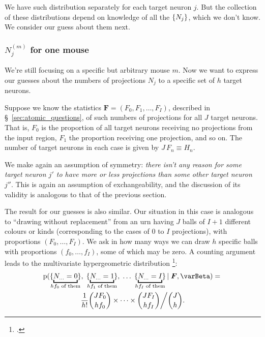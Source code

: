 \documentclass[\ifafour a4paper,12pt,\else a5paper,10pt,\fi%
onecolumn,oneside,article,%
british%
]{memoir}
\theoremstyle{remark}
\theoremstyle{innote}
\newcommand*{\citep}{\footcites}
\newcommand*{\pf}{\mathrm{p}}%
\renewcommand*{\|}[1][]{\nonscript\,#1\vert\nonscript\;\mathopen{}}
\newcommand*{\sect}{\S}%
\newcommand*{\chap}{ch.}%
\newcommand*{\yI}{\varBeta}
\newcommand*{\yF}{\bm{F}}
\newcommand*{\yNm}[1][m]{N^{(#1)}}
\DeclarePairedDelimiter\tu{\{}{\}}
\begin{document}
We have such distribution separately for each target neuron $j$. But the
collection of these distributions depend on knowledge of all the
$\tu{N_{j}}$, which we don't know. We consider our guess about them next.



\subsubsection{$\yNm_{j}$ for one mouse}
\label{sec:onemouse_exch}

We're still focusing on a specific but arbitrary mouse $m$. Now we want to
express our guesses about the numbers of projections $N_{j}$ to a specific
set of $h$ target neurons.

Suppose we know the statistics $\yF=(F_{0}, F_{1}, \dotsc, F_{I})$,
described in \sect~\ref{sec:atomic_questions}, of such numbers of
projections for all $J$ target neurons. That is, $F_{0}$ is the proportion
of all target neurons receiving no projections from the input region,
$F_{1}$ the proportion receiving one projection, and so on. The number of
target neurons in each case is given by $J\,F_{n} \equiv H_{n}$.

We make again an assumption of symmetry: \emph{there isn't any reason for
  some target neuron $j'$ to have more or less projections than some other
  target neuron $j''$}. This is again an assumption of exchangeability, and
the discussion of its validity is analogous to that of the previous
section.

The result for our guesses is also similar. Our situation in this case is
analogous to \enquote{drawing without replacement} from an urn having $J$
balls of $I+1$ different colours or kinds (corresponding to the cases of
$0$ to $I$ projections), with proportions $(F_{0}, \dotsc, F_{I})$. We ask
in how many ways we can draw $h$ specific balls with proportions
$(f_{0}, \dotsc, f_{I})$, some of which may be zero. A counting argument
leads to the multivariate hypergeometric distribution
\citep[\chap~39]{johnsonetal1969_r1996}:
\begin{multline}
  \label{eq:definetti_Nj_finite}
  \pf(\tu{\underbracket{N_{\dotso}=0}_{\mathclap{\text{$hf_{0}$ of them}}}},
  \;\tu{\underbracket{N_{\dotso}=1}_{\mathclap{\text{$hf_{1}$ of them}}}},
\;\dotsc
  \;\tu{\underbracket{N_{\dotso}=I}_{\mathclap{\text{$hf_{I}$ of them}}}}
  \| \yF, \yI)
  ={}\\
  \frac{1}{h!}
  \binom{JF_{0}}{hf_{0}}\times\dotsm\times\binom{JF_{I}}{hf_{I}}\bigg/
  \binom{J}{h}.
\end{multline}
\end{document}
